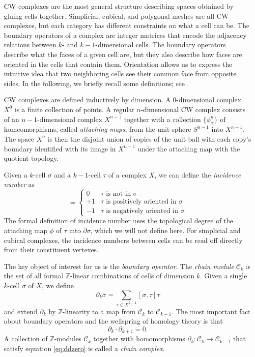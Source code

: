 \documentclass[twocolumn]{article}
\begin{document}
CW complexes are the most general structure describing spaces obtained by gluing cells together.
Simplicial, cubical, and polygonal meshes are all CW complexes, but each category has different constraints on what a cell can be.
The boundary operators of a complex are integer matrices that encode the adjacency relations between $k$- and $k - 1$-dimensional cells.
The boundary operators describe what the faces of a given cell are, but they also describe how faces are oriented in the cells that contain them.
Orientation allows us to express the intuitive idea that two neighboring cells see their common face from opposite sides.
In the following, we briefly recall some definitions; see \cite{hatcher2002algebraic}.

CW complexes are defined inductively by dimension.
A 0-dimensional complex $X^0$ is a finite collection of points.
A regular $n$-dimensional CW complex consists of an $n - 1$-dimensional complex $X^{n - 1}$ together with a collection $\{\phi_\alpha^n\}$ of homeomorphisms, called \emph{attaching maps}, from the unit sphere $S^{n - 1}$ into $X^{n - 1}$.
The space $X^n$ is then the disjoint union of copies of the unit ball with each copy's boundary identified with its image in $X^{n - 1}$ under the attaching map with the quotient topology.

Given a $k$-cell $\sigma$ and a $k - 1$-cell $\tau$ of a complex $X$, we can define the \emph{incidence number} as
\begin{equation}
    [\sigma, \tau] = \begin{cases}0 & \tau\text{ is not in }\sigma \\ +1 & \tau \text{ is positively oriented in }\sigma \\ -1 & \tau\text{ is negatively oriented in }\sigma\end{cases}
\end{equation}
The formal definition of incidence number uses the topological degree of the attaching map $\phi$ of $\tau$ into $\partial\sigma$, which we will not define here.
For simplicial and cubical complexes, the incidence numbers between cells can be read off directly from their constituent vertexes.

The key object of interest for us is the \emph{boundary operator}.
The \emph{chain module} $\mathscr{C}_k$ is the set of all formal $\mathbb{Z}$-linear combinations of cells of dimension $k$.
Given a single $k$-cell $\sigma$ of $X$, we define
\begin{equation}
    \partial_k\sigma = \sum_{\tau \in X^{k - 1}}[\sigma, \tau]\tau
\end{equation}
and extend $\partial_k$ by $\mathbb{Z}$-linearity to a map from $\mathscr{C}_k$ to $\mathscr{C}_{k - 1}$.
The most important fact about boundary operators and the wellspring of homology theory is that
\begin{equation}
    \partial_k\cdot\partial_{k + 1} = 0.
    \label{eq:ddzero}
\end{equation}
A collection of $\mathbb{Z}$-modules $\mathscr{C}_k$ together with homomorphisms $\partial_k : \mathscr{C}_k \to \mathscr{C}_{k - 1}$ that satisfy equation \eqref{eq:ddzero} is called a \emph{chain complex}.
\end{document}
